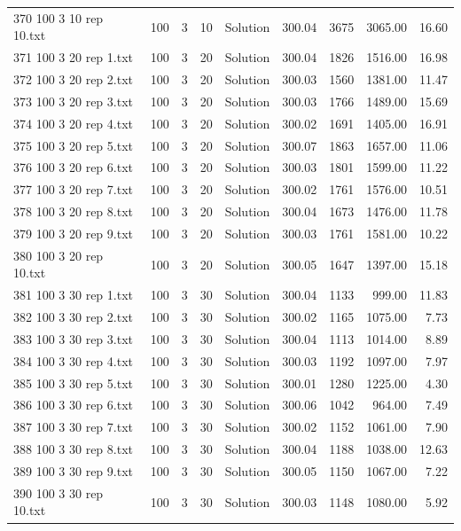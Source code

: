 \begin{longtable}{lrrllrrrr}
370 100 3 10 rep 10.txt & 100 & 3 & 10 & Solution & 300.04 & 3675 & 3065.00 & 16.60\\
371 100 3 20 rep 1.txt & 100 & 3 & 20 & Solution & 300.04 & 1826 & 1516.00 & 16.98\\
372 100 3 20 rep 2.txt & 100 & 3 & 20 & Solution & 300.03 & 1560 & 1381.00 & 11.47\\
373 100 3 20 rep 3.txt & 100 & 3 & 20 & Solution & 300.03 & 1766 & 1489.00 & 15.69\\
374 100 3 20 rep 4.txt & 100 & 3 & 20 & Solution & 300.02 & 1691 & 1405.00 & 16.91\\
375 100 3 20 rep 5.txt & 100 & 3 & 20 & Solution & 300.07 & 1863 & 1657.00 & 11.06\\
376 100 3 20 rep 6.txt & 100 & 3 & 20 & Solution & 300.03 & 1801 & 1599.00 & 11.22\\
377 100 3 20 rep 7.txt & 100 & 3 & 20 & Solution & 300.02 & 1761 & 1576.00 & 10.51\\
378 100 3 20 rep 8.txt & 100 & 3 & 20 & Solution & 300.04 & 1673 & 1476.00 & 11.78\\
379 100 3 20 rep 9.txt & 100 & 3 & 20 & Solution & 300.03 & 1761 & 1581.00 & 10.22\\
380 100 3 20 rep 10.txt & 100 & 3 & 20 & Solution & 300.05 & 1647 & 1397.00 & 15.18\\
381 100 3 30 rep 1.txt & 100 & 3 & 30 & Solution & 300.04 & 1133 & 999.00 & 11.83\\
382 100 3 30 rep 2.txt & 100 & 3 & 30 & Solution & 300.02 & 1165 & 1075.00 &  7.73\\
383 100 3 30 rep 3.txt & 100 & 3 & 30 & Solution & 300.04 & 1113 & 1014.00 &  8.89\\
384 100 3 30 rep 4.txt & 100 & 3 & 30 & Solution & 300.03 & 1192 & 1097.00 &  7.97\\
385 100 3 30 rep 5.txt & 100 & 3 & 30 & Solution & 300.01 & 1280 & 1225.00 &  4.30\\
386 100 3 30 rep 6.txt & 100 & 3 & 30 & Solution & 300.06 & 1042 & 964.00 &  7.49\\
387 100 3 30 rep 7.txt & 100 & 3 & 30 & Solution & 300.02 & 1152 & 1061.00 &  7.90\\
388 100 3 30 rep 8.txt & 100 & 3 & 30 & Solution & 300.04 & 1188 & 1038.00 & 12.63\\
389 100 3 30 rep 9.txt & 100 & 3 & 30 & Solution & 300.05 & 1150 & 1067.00 &  7.22\\
390 100 3 30 rep 10.txt & 100 & 3 & 30 & Solution & 300.03 & 1148 & 1080.00 &  5.92\\

\end{longtable}
